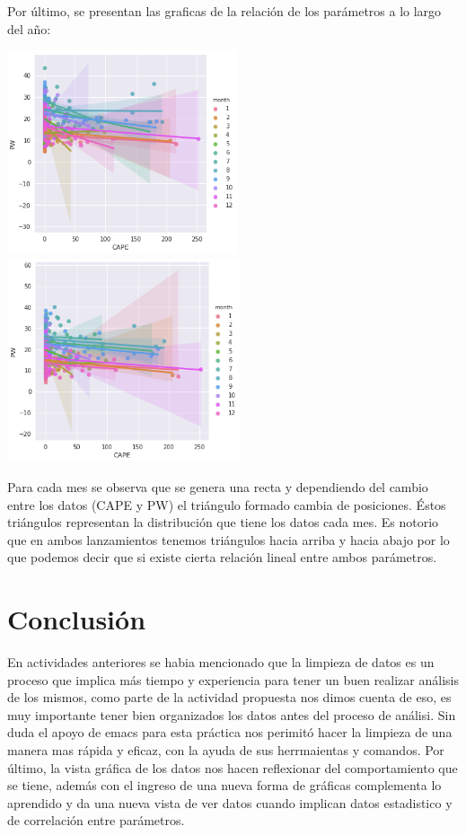 \documentclass[12pt]{article}
\begin{document}
Por último, se presentan las graficas de la relación de los parámetros a lo largo del año:
\begin{center}
	\includegraphics[height=6cm]{01111.png} \hspace*{\fill}
    \includegraphics[height=6cm]{02222.png}
\end{center}
Para cada mes se observa que se genera una recta y dependiendo del cambio entre los datos (CAPE y PW) el triángulo formado cambia de posiciones. Éstos triángulos representan la distribución que tiene los datos cada mes. Es notorio que en ambos lanzamientos tenemos triángulos hacia arriba y hacia abajo por lo que podemos decir que si existe cierta relación lineal entre ambos parámetros.

\section*{Conclusión}
En actividades anteriores se habia mencionado que la limpieza de datos es un proceso que implica más tiempo y experiencia para tener un buen realizar análisis de los mismos, como parte de la actividad propuesta nos dimos cuenta de eso, es muy importante tener bien organizados los datos antes del proceso de análisi. Sin duda el apoyo de emacs para esta práctica nos perimitó hacer la limpieza de una manera mas rápida y eficaz, con la ayuda de sus herrmaientas y comandos. Por último, la vista gráfica de los datos nos hacen reflexionar del comportamiento que se tiene, además con el ingreso de una nueva forma de gráficas complementa lo aprendido y da una nueva vista de ver datos cuando implican datos estadistico y de correlación entre parámetros.
\end{document}
